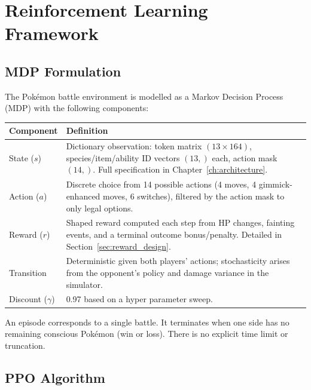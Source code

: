 \chapter{Reinforcement Learning Framework}
\label{ch:rl_framework}

\section{MDP Formulation}

The Pok\'{e}mon battle environment is modelled as a Markov Decision Process
(MDP) with the following components:

\begin{center}
\small
\begin{tabularx}{\textwidth}{l X}
  \toprule
  \textbf{Component} & \textbf{Definition} \\
  \midrule
  State ($s$)       & Dictionary observation: token matrix $(13 \times 164)$,
                      species/item/ability ID vectors $(13,)$ each, action
                      mask $(14,)$.  Full specification in
                      Chapter~\ref{ch:architecture}. \\
  Action ($a$)       & Discrete choice from 14 possible actions (4 moves,
                      4 gimmick-enhanced moves, 6 switches), filtered by the
                      action mask to only legal options. \\
  Reward ($r$)       & Shaped reward computed each step from HP changes,
                      fainting events, and a terminal outcome bonus/penalty.
                      Detailed in Section~\ref{sec:reward_design}. \\
  Transition         & Deterministic given both players' actions;
                      stochasticity arises from the opponent's policy and
                      damage variance in the simulator. \\
  Discount ($\gamma$) & 0.97 based on a hyper parameter sweep. \\
  \bottomrule
\end{tabularx}
\end{center}

An episode corresponds to a single battle.  It terminates when one side has no
remaining conscious Pok\'{e}mon (win or loss).  There is no explicit time limit
or truncation.

\section{PPO Algorithm}


